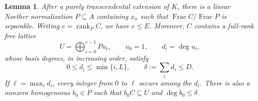 \documentclass[12pt]{amsart}
\numberwithin{equation}{section}
\newtheorem{lemma}[theorem]{Lemma}
\theoremstyle{definition}
\theoremstyle{remark}
\numberwithin{equation}{section}
\begin{document}
\begin{lemma}\label{lem:source-lattice}
After a purely transcendental extension of $K$, there is a linear Noether normalization $P\subseteq A$ containing $x_n$ such that $\operatorname{Frac}C/\operatorname{Frac}P$ is separable. Writing $e=\operatorname{rank}_P C$, we have $e\le E$. Moreover, $C$ contains a full-rank free lattice
\[
 U=\bigoplus_{i=0}^{e-1}Pu_i,\qquad u_0=1,\qquad d_i=\deg u_i,
\]
whose basis degrees, in increasing order, satisfy
\begin{equation}\label{eq:source-lattice-degrees}
 0\le d_i\le\min\{i,L\},\qquad \delta:=\sum_i d_i\le D.
\end{equation}
If $\ell=\max_i d_i$, every integer from $0$ to $\ell$ occurs among the $d_i$. There is also a nonzero homogeneous $b_0\in P$
such that $b_0C\subseteq U$ and $\deg b_0\le\delta$.
\end{lemma}
\end{document}
